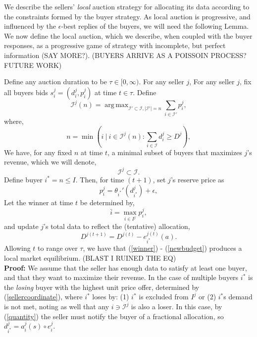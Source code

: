 \documentclass[12pt]{article}
\theoremstyle{definition}
\newcommand{\mcI}{\mathcal{I}}
\DeclareMathOperator*{\argmax}{arg\,max}
\begin{document}
\begin{multicols}{2}
We describe the sellers' \emph{local} auction strategy for allocating its
data according to the constraints formed by the buyer strategy. As
local auction is progressive, and influenced by the $\epsilon$-best replies of
the buyers, we will need the following Lemma. 
We now define the local auction, which we describe, when coupled with the buyer
responses, as a progressive game of strategy with incomplete, but perfect
information (SAY MORE?).
(BUYERS ARRIVE AS A POISSOIN PROCESS? FUTURE WORK)

{
\label{sellerstrategy}
Define any auction duration to be $\tau \in [0,\infty)$. For any seller $j$,
For any seller $j$, fix all buyers bids $s_i^j=(d_i^j,p_i^j)$ at time $t\in\tau$.
Define
$$
    \mcI^j(n) =\argmax_{{\mcI}' \subset \mcI, \vert{\mcI}'\vert =
n}\sum_{i\in{\mcI}'} p_i^j,
$$
where,
\begin{equation}\label{sellercoordinate}
    n = \min( i \ \vert \ i \in\mcI^j(n) : \displaystyle\sum_{i\in\mcI} d_i^j \ge
D^j),
\end{equation} 
We have, for any fixed $n$ at time $t$, a minimal subset 
of buyers that maximizes $j$'s revenue, which we will
denote,
\begin{equation}\label{buyers}
    \mcI^j \subset \mcI.
\end{equation} 
Define buyer $i^* = n \le I$.
Then, for time $(t+1)$, set $j$'s reserve price as 
\begin{equation}\label{newprice}
    p_i^j = \theta_{i^*}'(d_{i^*}^j) + \epsilon,
\end{equation}
Let the winner at time $t$ be determined by,
\begin{equation}\label{winner}
    \bar{i} = \displaystyle\max_{i\in I^j} p_i^j,
\end{equation}
and update $j$'s total data to reflect the (tentative) allocation,
\begin{equation}\label{newbudget}
    D^{j(t+1)} = D^{j(t)} - e_{i^*}^{j(t)}(a).
\end{equation}
Allowing $t$ to range over $\tau$, we have that (\ref{winner}) - (\ref{newbudget}) produces a local
market equilibrium. (BLAST I RUINED THE EQ) %
}\\
\textbf{Proof:}
We assume that the seller has enough data to satisfy at least one buyer,
and that they want to maximize their revenue.
In the case of multiple buyers $i^*$ is the \emph{losing} buyer with the highest unit
price offer, determined by (\ref{sellercoordinate}), where $i^*$ loses by: (1)
$i^*$ is excluded from $I^j$ or (2) $i^*$s demand is not met, noting as well
that any $i\ni \mcI^j$ is also a loser. 
In this case, by (\ref{quantity}) the seller must notify the buyer of a fractional allocation, so
$d_{i^*}^j = a_i^j(s) \circ e_i^j$.


\end{multicols}
\end{document}
